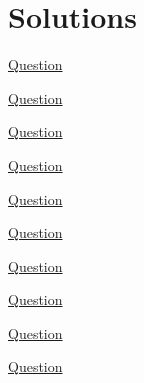 \documentclass[../probability-notes.tex]{subfiles}
\begin{document}
    \section{Solutions}
    \begin{enumerate}
        \item \hypertarget{a_indcomp}{\hyperlink{q_indcomp}{Question}}
        

        \item \hypertarget{a_conind}{\hyperlink{q_conind}{Question}}
        

        \hypertarget{a_geomeet}{\item} \hyperlink{q_geomeet}{Question} \newline
        
    
        \hypertarget{a_expfn}{\item} \hyperlink{q_expfn}{Question}
        
    
        \hypertarget{a_cumuldistfn}{\item} \hyperlink{q_cumuldistfn}{Question} \newline
        
        
        \hypertarget{a_tossh}{\item} \hyperlink{q_tossh}{Question} \newline
        

        \hypertarget{a_itrexpproof}{\item} \hyperlink{q_itrexpproof}{Question} \newline
        

        \hypertarget{a_itrexpthree}{\item} \hyperlink{q_itrexpthree}{Question} \newline
        
    
        \hypertarget{a_itrexppractice}{\item} \hyperlink{q_itrexppractice}{Question}\newline
        
        
        \hypertarget{a_hatproblem}{\item} \hyperlink{q_hatproblem}{Question}\newline
        


\end{enumerate}
\end{document}
